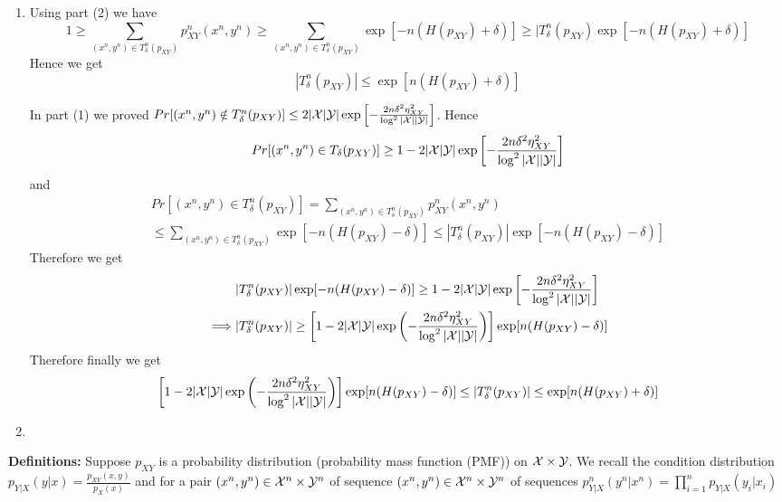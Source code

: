 \documentclass[a4paper, 11pt]{article}
\begin{document}
{\begin{enumerate}
		Now using the claim we get $$\exp\lt[-n\lt( H(p_{XY})-\frac{\delta H(p_{XY})}{\log |\mcX||\mcY|}\rt)\rt]\leq \exp [-n(H(p_{XY})-\delta)]$$
		$$\exp\lt[-n\lt( H(p_{XY})+\frac{\delta H(p_{XY})}{\log |\mcX||\mcY|} \rt)\rt]\geq \exp[-n(H(p_{XY})+\delta)]$$
		
Hence we get if $(x^n,y^n)\in T_{\delta}^n(p_{XY})$ then $$ \exp [-n(H(p_{XY})+\delta)] \leq p^n_{XY}(x^n,y^n)\leq \exp [-n(H(p_{XY})-\delta)]$$
		
		
		\item Using part (2) we have $$1\geq \sum_{(x^n,y^n)\in T_{\delta}^n(p_{XY})}p_{XY}^n(x^n,y^n)\geq \sum_{(x^n,y^n)\in T_{\delta}^n(p_{XY})}\exp[-n(H(p_{XY})+\delta)]\geq |T_{\delta}^n(p_{XY})\exp[-n(H(p_{XY})+\delta)]$$Hence we get $$|T_{\delta}^n(p_{XY})|\leq \exp[n(H(p_{XY})+\delta)]$$
		
		In part (1) we proved  $Pr[(x^n,y^n)\notin T_{\delta}^n(p_{XY})]\leq  2|\mathcal{X}|\mathcal{Y}|\exp\left[ -\frac{2n\delta^2 \eta_{XY}^2}{\log^2 |\mathcal{X}||\mathcal{Y}|} \right]$. Hence $$Pr[(x^n,y^n)\in T_{\delta}(p_{XY})]\geq 1-2|\mathcal{X}|\mathcal{Y}|\exp\left[ -\frac{2n\delta^2 \eta_{XY}^2}{\log^2 |\mathcal{X}||\mathcal{Y}|} \right]$$ and \begin{multline*}
			Pr[(x^n,y^n)\in T_{\delta}^n(p_{XY})]=\sum_{(x^n,y^n)\in T_{\delta}^n(p_{XY})} p_{XY}^n(x^n,y^n)\\
			\leq \sum_{(x^n,y^n)\in T_{\delta}^n(p_{XY})}\exp[-n(H(p_{XY})-\delta)]\leq |T_{\delta}^n(p_{XY})|\exp[-n(H(p_{XY})-\delta)]
		\end{multline*}Therefore we get \begin{align*}
		& |T_{\delta}^n(p_{XY})|\exp[-n(H(p_{XY})-\delta)]\geq 1-2|\mathcal{X}|\mathcal{Y}|\exp\left[ -\frac{2n\delta^2 \eta_{XY}^2}{\log^2 |\mathcal{X}||\mathcal{Y}|} \right]\\
		\implies & |T_{\delta}^n(p_{XY})|\geq \left[  1-2|\mathcal{X}|\mathcal{Y}|\exp\left( -\frac{2n\delta^2 \eta_{XY}^2}{\log^2 |\mathcal{X}||\mathcal{Y}|} \right)  \right]\exp[n(H(p_{XY})-\delta)]
		\end{align*}Therefore finally we get \begin{multline*}
		\left[  1-2|\mathcal{X}|\mathcal{Y}|\exp\left( -\frac{2n\delta^2 \eta_{XY}^2}{\log^2 |\mathcal{X}||\mathcal{Y}|} \right)  \right]\exp[n(H(p_{XY})-\delta)]\leq |T_{\delta}^n(p_{XY})|\leq \exp[n(H(p_{XY})+\delta)]
		\end{multline*}
		
		\item 
	\end{enumerate}
}

\pagebreak

 \parinf \textbf{Definitions:} Suppose $p_{XY}$ is a probability distribution (probability mass function (PMF)) on $\mathcal{X}\times \mathcal{Y}$. We recall the condition distribution $p_{Y|X}(y|x)=\frac{p_{XY}(x,y)}{p_X(x)}$ and  for a pair $(x^n,y^n)\in \mathcal{X}^n\times \mathcal{Y}^n$ of sequence $(x^n,y^n)\in \mathcal{X}^n\times \mathcal{Y}^n$ of sequences $p_{Y|X}^n(y^n|x^n)=\prod\limits_{i=1}^np_{Y|X}(y_i|x_i)$\parinn
 	
\end{document}
